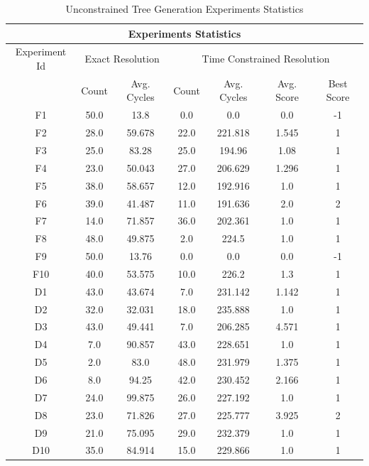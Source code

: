 \documentclass[a4paper,10pt,titlepage]{article}
\begin{document}
\begin{table}[H] 
\caption{Unconstrained Tree Generation Experiments Statistics} %
\centering 
\begin{tabular}{c @{\extracolsep{12pt}} c c @{\extracolsep{12pt}} c c c c }

\multicolumn{7}{c}{\textbf{Experiments Statistics}} \\
\hline
Experiment Id & \multicolumn{2}{c}{Exact Resolution} & \multicolumn{4}{c}{Time Constrained Resolution}\\
\cline{2-3}\cline{4-7}
 & Count & Avg. Cycles & Count & Avg. Cycles & Avg. Score & Best Score\\
\cline{2-3}\cline{4-7}
F1 & 50.0 & 13.8 & 0.0 & 0.0 & 0.0 & -1 \\
F2 & 28.0 & 59.678 & 22.0 & 221.818 & 1.545 & 1 \\
F3 & 25.0 & 83.28 & 25.0 & 194.96 & 1.08 & 1 \\
F4 & 23.0 & 50.043 & 27.0 & 206.629 & 1.296 & 1 \\
F5 & 38.0 & 58.657 & 12.0 & 192.916 & 1.0 & 1 \\
F6 & 39.0 & 41.487 & 11.0 & 191.636 & 2.0 & 2 \\
F7 & 14.0 & 71.857 & 36.0 & 202.361 & 1.0 & 1 \\
F8 & 48.0 & 49.875 & 2.0 & 224.5 & 1.0 & 1 \\
F9 & 50.0 & 13.76 & 0.0 & 0.0 & 0.0 & -1 \\
F10 & 40.0 & 53.575 & 10.0 & 226.2 & 1.3 & 1 \\
D1 & 43.0 & 43.674 & 7.0 & 231.142 & 1.142 & 1 \\
D2 & 32.0 & 32.031 & 18.0 & 235.888 & 1.0 & 1 \\
D3 & 43.0 & 49.441 & 7.0 & 206.285 & 4.571 & 1 \\
D4 & 7.0 & 90.857 & 43.0 & 228.651 & 1.0 & 1 \\
D5 & 2.0 & 83.0 & 48.0 & 231.979 & 1.375 & 1 \\
D6 & 8.0 & 94.25 & 42.0 & 230.452 & 2.166 & 1 \\
D7 & 24.0 & 99.875 & 26.0 & 227.192 & 1.0 & 1 \\
D8 & 23.0 & 71.826 & 27.0 & 225.777 & 3.925 & 2 \\
D9 & 21.0 & 75.095 & 29.0 & 232.379 & 1.0 & 1 \\
D10 & 35.0 & 84.914 & 15.0 & 229.866 & 1.0 & 1 \\

\end{tabular} 
\label{tab:uncon_result} 
\end{table}
\end{document}
